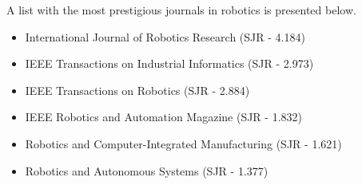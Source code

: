 A list with the most prestigious journals in robotics is presented below.

\begin{itemize}
	\item International Journal of Robotics Research (SJR - 4.184)
	\item IEEE Transactions on Industrial Informatics (SJR - 2.973)
	\item IEEE Transactions on Robotics (SJR - 2.884)
	\item IEEE Robotics and Automation Magazine (SJR - 1.832)
	\item Robotics and Computer-Integrated Manufacturing (SJR - 1.621)
	\item Robotics and Autonomous Systems (SJR - 1.377)
\end{itemize}
